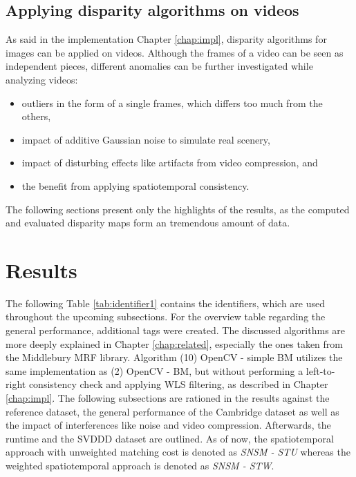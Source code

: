 \subsection*{Applying disparity algorithms on videos}

As said in the implementation Chapter \ref{chap:impl}, disparity algorithms for images can be applied on videos.
Although the frames of a video can be seen as independent pieces, different anomalies can be further investigated while analyzing videos:

\begin{itemize}
  \item outliers in the form of a single frames, which differs too much from the others,
  \item impact of additive Gaussian noise to simulate real scenery,
  \item impact of disturbing effects like artifacts from video compression, and
  \item the benefit from applying spatiotemporal consistency.
\end{itemize}

\noindent The following sections present only the highlights of the results, as the computed and evaluated disparity maps form an tremendous amount of data.

\section{Results}

The following Table \ref{tab:identifier1} contains the identifiers, which are used throughout the upcoming subsections.
For the overview table regarding the general performance, additional tags were created.
The discussed algorithms are more deeply explained in Chapter \ref{chap:related}, especially the ones taken from the Middlebury MRF library.
Algorithm (10) OpenCV - simple BM utilizes the same implementation as (2) OpenCV - BM, but without performing a left-to-right consistency check and applying WLS filtering, as described in Chapter \ref{chap:impl}.
The following subsections are rationed in the results against the reference dataset, the general performance of the Cambridge dataset as well as the impact of interferences like noise and video compression.
Afterwards, the runtime and the SVDDD dataset are outlined.
As of now, the spatiotemporal approach with unweighted matching cost is denoted as \textit{SNSM - STU} whereas the weighted spatiotemporal approach is denoted as \textit{SNSM - STW}.

